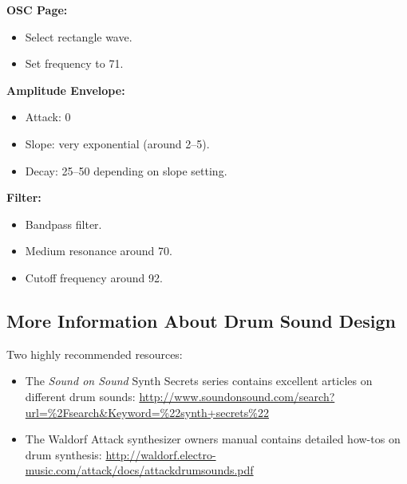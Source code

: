 \textbf{OSC Page:}

\begin{itemize}
\tightlist
\item
  Select rectangle wave.
\item
  Set frequency to 71.
\end{itemize}

\textbf{Amplitude Envelope:}

\begin{itemize}
\tightlist
\item
  Attack: 0
\item
  Slope: very exponential (around 2--5).
\item
  Decay: 25--50 depending on slope setting.
\end{itemize}

\textbf{Filter:}

\begin{itemize}
\tightlist
\item
  Bandpass filter.
\item
  Medium resonance around 70.
\item
  Cutoff frequency around 92.
\end{itemize}

\subsection{More Information About Drum Sound
Design}\label{more-information-about-drum-sound-design}

Two highly recommended resources:

\begin{itemize}
\item
  The \emph{Sound on Sound} Synth Secrets series contains excellent
  articles on different drum sounds:
  \url{http://www.soundonsound.com/search?url=\%2Fsearch&Keyword=\%22synth+secrets\%22}
\item
  The Waldorf Attack synthesizer owners manual contains detailed how-tos
  on drum synthesis:
  \url{http://waldorf.electro-music.com/attack/docs/attackdrumsounds.pdf}
\end{itemize}

